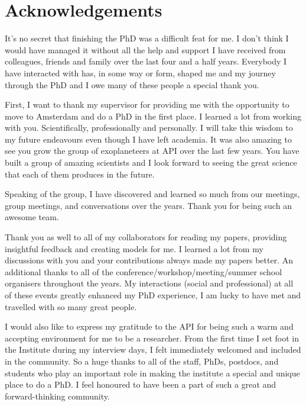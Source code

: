 
\setcounter{footnote}{0}


\chapter{Acknowledgements}


\vspace{10mm}

It’s no secret that finishing the PhD was a difficult feat for me. I don’t think I would have managed it without all the help and support I have received from colleagues, friends and family over the last four and a half years. Everybody I have interacted with has, in some way or form, shaped me and my journey through the PhD and I owe many of these people a special thank you.

First, I want to thank my supervisor for providing me with the opportunity to move to Amsterdam and do a PhD in the first place. I learned a lot from working with you. Scientifically, professionally and personally. I will take this wisdom to my future endeavours even though I have left academia. It was also amazing to see you grow the group of exoplaneteers at API over the last few years. You have built a group of amazing scientists and I look forward to seeing the great science that each of them produces in the future.

Speaking of the group, I have discovered and learned so much from our meetings, group meetings, and conversations over the years. Thank you for being such an awesome team.

Thank you as well to all of my collaborators for reading my papers, providing insightful feedback and creating models for me. I learned a lot from my discussions with you and your contributions always made my papers better. An additional thanks to all of the conference/workshop/meeting/summer school organisers throughout the years. My interactions (social and professional) at all of these events greatly enhanced my PhD experience, I am lucky to have met and travelled with so many great people.

I would also like to express my gratitude to the API for being such a warm and accepting environment for me to be a researcher. From the first time I set foot in the Institute during my interview days, I felt immediately welcomed and included in the community. So a huge thanks to all of the staff, PhDs, postdocs, and students who play an important role in making the institute a special and unique place to do a PhD. I feel honoured to have been a part of such a great and forward-thinking community.

